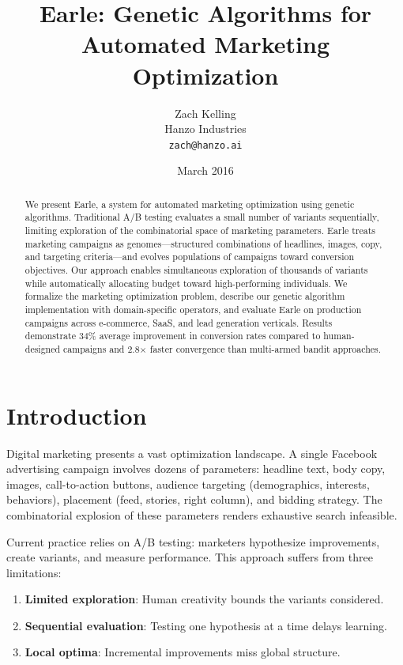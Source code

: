 \documentclass[11pt,twocolumn]{article}
\title{Earle: Genetic Algorithms for Automated Marketing Optimization}
\author{Zach Kelling\\
Hanzo Industries\\
\texttt{zach@hanzo.ai}}
\date{March 2016}
\begin{document}
\luxcoverpage
\maketitle

\begin{abstract}
We present Earle, a system for automated marketing optimization using genetic algorithms. Traditional A/B testing evaluates a small number of variants sequentially, limiting exploration of the combinatorial space of marketing parameters. Earle treats marketing campaigns as genomes—structured combinations of headlines, images, copy, and targeting criteria—and evolves populations of campaigns toward conversion objectives. Our approach enables simultaneous exploration of thousands of variants while automatically allocating budget toward high-performing individuals. We formalize the marketing optimization problem, describe our genetic algorithm implementation with domain-specific operators, and evaluate Earle on production campaigns across e-commerce, SaaS, and lead generation verticals. Results demonstrate 34\% average improvement in conversion rates compared to human-designed campaigns and 2.8$\times$ faster convergence than multi-armed bandit approaches.
\end{abstract}

\section{Introduction}

Digital marketing presents a vast optimization landscape. A single Facebook advertising campaign involves dozens of parameters: headline text, body copy, images, call-to-action buttons, audience targeting (demographics, interests, behaviors), placement (feed, stories, right column), and bidding strategy. The combinatorial explosion of these parameters renders exhaustive search infeasible.

Current practice relies on A/B testing: marketers hypothesize improvements, create variants, and measure performance. This approach suffers from three limitations:

\begin{enumerate}
\item \textbf{Limited exploration}: Human creativity bounds the variants considered.
\item \textbf{Sequential evaluation}: Testing one hypothesis at a time delays learning.
\item \textbf{Local optima}: Incremental improvements miss global structure.
\end{enumerate}
\end{document}
